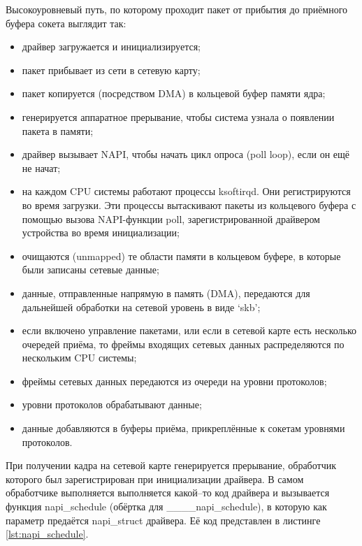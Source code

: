 Высокоуровневый путь, по которому проходит пакет от прибытия до приёмного буфера сокета выглядит так:
\begin{itemize}[label=---]
	\item драйвер загружается и инициализируется;
	\item пакет прибывает из сети в сетевую карту;
	\item пакет копируется (посредством DMA) в кольцевой буфер памяти ядра;
	\item генерируется аппаратное прерывание, чтобы система узнала о появлении пакета в памяти;
	\item драйвер вызывает NAPI, чтобы начать цикл опроса (poll loop), если он ещё не начат;
	\item на каждом CPU системы работают процессы ksoftirqd. Они регистрируются во время загрузки. Эти процессы вытаскивают пакеты из кольцевого буфера с помощью вызова NAPI-функции poll, зарегистрированной драйвером устройства во время инициализации;
	\item очищаются (unmapped) те области памяти в кольцевом буфере, в которые были записаны сетевые данные;
	\item данные, отправленные напрямую в память (DMA), передаются для дальнейшей обработки на сетевой уровень в виде ‘skb’;
	\item если включено управление пакетами, или если в сетевой карте есть несколько очередей приёма, то фреймы входящих сетевых данных распределяются по нескольким CPU системы;
	\item фреймы сетевых данных передаются из очереди на уровни протоколов;
	\item уровни протоколов обрабатывают данные;
	\item данные добавляются в буферы приёма, прикреплённые к сокетам уровнями протоколов.
\end{itemize}

При получении кадра на сетевой карте генерируется прерывание, обработчик которого был зарегистрирован при инициализации драйвера. В самом обработчике выполняется выполняется какой--то код драйвера и вызывается функция napi\_schedule (обёртка для \_\_\_\_napi\_schedule), в которую как параметр предаётся napi\_struct драйвера. Её код представлен в листинге \ref{lst:napi_schedule}.

